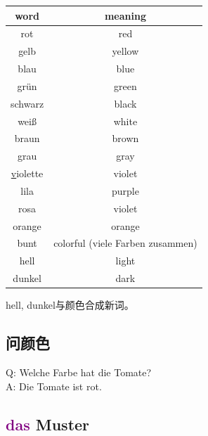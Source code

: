 \begin{center}
    \begin{tabular} {|c|c|}
        \hline
        \rowcolor{gray}
        word                 & meaning                          \\
        \hline
        rot                  & red                              \\
        gelb                 & yellow                           \\
        blau                 & blue                             \\
        grün                 & green                            \\
        schwarz              & black                            \\
        weiß                 & white                            \\
        braun                & brown                            \\
        grau                 & gray                             \\
        \hline
        \underline{v}iolette & violet                           \\
        lila                 & purple                           \\
        rosa                 & violet                           \\
        oran\underline{g}e   & orange                           \\
        \hline
        bunt                 & colorful (viele Farben zusammen) \\
        hell                 & light                            \\
        dunkel               & dark                             \\
        \hline
    \end{tabular}
\end{center}

hell, dunkel与颜色合成新词。
\subsection{问颜色}
\noindent
Q: Welche Farbe hat die Tomate? \\
A: Die Tomate ist rot. \\

\subsection{\textcolor{purple}{das} Muster}

